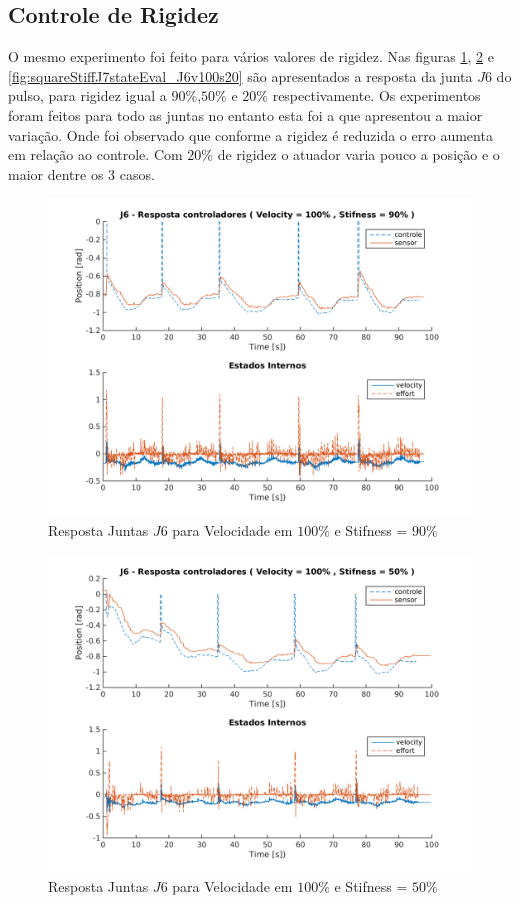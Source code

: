 \subsection{Controle de Rigidez}

O mesmo experimento foi feito para vários valores de rigidez. Nas figuras \ref{fig:squareStiffJ10stateEval_J6v100s90}, \ref{fig:squareStiffJ6stateEval_J6v100s50} e \ref{fig:squareStiffJ7stateEval_J6v100s20} são apresentados a resposta da junta $J6$ do pulso, para rigidez igual a $90\%$,$50\%$ e $20\%$ respectivamente. Os experimentos foram feitos para todo as juntas no entanto esta foi a que apresentou a maior variação. Onde foi observado que conforme a rigidez é reduzida o erro aumenta em relação ao controle. Com $20\%$ de rigidez o atuador varia pouco a posição e o maior dentre os 3 casos.

\vspace{1cm}

\begin{figure}[H]
    \centering
    \includegraphics[width=0.6\linewidth,trim={2cm 1cm 2cm 2cm}]{tex/figs/squareStiffJ10stateEval_J6v100s90.png}
    \caption{Resposta Juntas $J6$ para Velocidade em $100\%$ e Stifness = $90\%$ }
    \label{fig:squareStiffJ10stateEval_J6v100s90}
\end{figure}

\vspace{1cm}

\begin{figure}[H]
    \centering
    \includegraphics[width=0.6\linewidth,trim={2cm 1cm 2cm 2cm}]{tex/figs/squareStiffJ6stateEval_J6v100s50.png}
    \caption{Resposta Juntas $J6$ para Velocidade em $100\%$ e Stifness = $50\%$ }
    \label{fig:squareStiffJ6stateEval_J6v100s50}
\end{figure}

